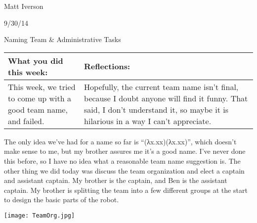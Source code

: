 Matt Iverson

9/30/14

Naming Team & Administrative Tasks

\begin{tabular}{|p{5cm}|p{5cm}|}
 \hline
 What you did this week: &
 Reflections: \\
 \hline
 This week, we tried to come up with a good team name, and failed. &
 Hopefully, the current team name isn’t final, because I doubt anyone will find it funny. That said, I don’t understand it, so maybe it is hilarious in a way I can’t appreciate. \\
 \hline
\end{tabular}

The only idea we’ve had for a name so far is “(λx.xx)(λx.xx)”, which doesn’t make sense to me, but my brother assures me it’s a good name. I’ve never done this before, so I have no idea what a reasonable team name suggestion is.
	The other thing we did today was discuss the team organization and elect a captain and assistant captain. My brother is the captain, and Ben is the assistant captain. My brother is splitting the team into a few different groups at the start to design the basic parts of the robot.

\texttt{[image: TeamOrg.jpg]}
